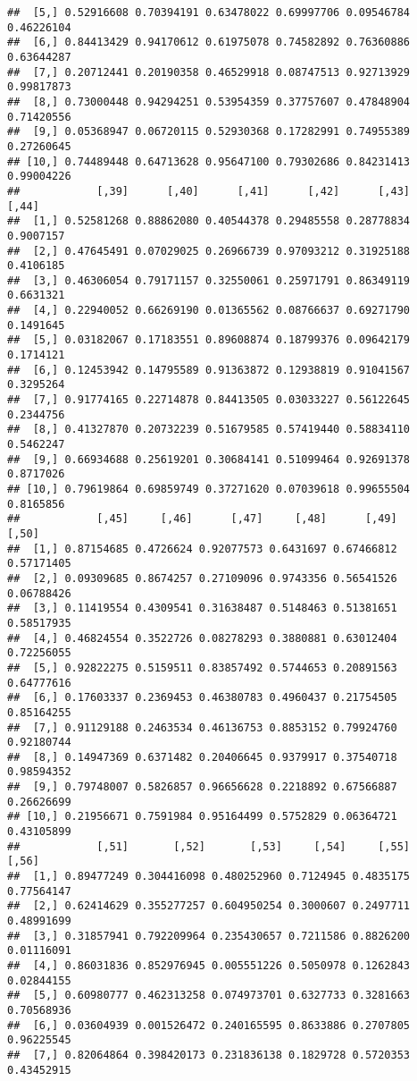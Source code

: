 \documentclass[
]{article}
\begin{document}
\begin{verbatim}
##  [5,] 0.52916608 0.70394191 0.63478022 0.69997706 0.09546784 0.46226104
##  [6,] 0.84413429 0.94170612 0.61975078 0.74582892 0.76360886 0.63644287
##  [7,] 0.20712441 0.20190358 0.46529918 0.08747513 0.92713929 0.99817873
##  [8,] 0.73000448 0.94294251 0.53954359 0.37757607 0.47848904 0.71420556
##  [9,] 0.05368947 0.06720115 0.52930368 0.17282991 0.74955389 0.27260645
## [10,] 0.74489448 0.64713628 0.95647100 0.79302686 0.84231413 0.99004226
##            [,39]      [,40]      [,41]      [,42]      [,43]     [,44]
##  [1,] 0.52581268 0.88862080 0.40544378 0.29485558 0.28778834 0.9007157
##  [2,] 0.47645491 0.07029025 0.26966739 0.97093212 0.31925188 0.4106185
##  [3,] 0.46306054 0.79171157 0.32550061 0.25971791 0.86349119 0.6631321
##  [4,] 0.22940052 0.66269190 0.01365562 0.08766637 0.69271790 0.1491645
##  [5,] 0.03182067 0.17183551 0.89608874 0.18799376 0.09642179 0.1714121
##  [6,] 0.12453942 0.14795589 0.91363872 0.12938819 0.91041567 0.3295264
##  [7,] 0.91774165 0.22714878 0.84413505 0.03033227 0.56122645 0.2344756
##  [8,] 0.41327870 0.20732239 0.51679585 0.57419440 0.58834110 0.5462247
##  [9,] 0.66934688 0.25619201 0.30684141 0.51099464 0.92691378 0.8717026
## [10,] 0.79619864 0.69859749 0.37271620 0.07039618 0.99655504 0.8165856
##            [,45]     [,46]      [,47]     [,48]      [,49]      [,50]
##  [1,] 0.87154685 0.4726624 0.92077573 0.6431697 0.67466812 0.57171405
##  [2,] 0.09309685 0.8674257 0.27109096 0.9743356 0.56541526 0.06788426
##  [3,] 0.11419554 0.4309541 0.31638487 0.5148463 0.51381651 0.58517935
##  [4,] 0.46824554 0.3522726 0.08278293 0.3880881 0.63012404 0.72256055
##  [5,] 0.92822275 0.5159511 0.83857492 0.5744653 0.20891563 0.64777616
##  [6,] 0.17603337 0.2369453 0.46380783 0.4960437 0.21754505 0.85164255
##  [7,] 0.91129188 0.2463534 0.46136753 0.8853152 0.79924760 0.92180744
##  [8,] 0.14947369 0.6371482 0.20406645 0.9379917 0.37540718 0.98594352
##  [9,] 0.79748007 0.5826857 0.96656628 0.2218892 0.67566887 0.26626699
## [10,] 0.21956671 0.7591984 0.95164499 0.5752829 0.06364721 0.43105899
##            [,51]       [,52]       [,53]     [,54]     [,55]      [,56]
##  [1,] 0.89477249 0.304416098 0.480252960 0.7124945 0.4835175 0.77564147
##  [2,] 0.62414629 0.355277257 0.604950254 0.3000607 0.2497711 0.48991699
##  [3,] 0.31857941 0.792209964 0.235430657 0.7211586 0.8826200 0.01116091
##  [4,] 0.86031836 0.852976945 0.005551226 0.5050978 0.1262843 0.02844155
##  [5,] 0.60980777 0.462313258 0.074973701 0.6327733 0.3281663 0.70568936
##  [6,] 0.03604939 0.001526472 0.240165595 0.8633886 0.2707805 0.96225545
##  [7,] 0.82064864 0.398420173 0.231836138 0.1829728 0.5720353 0.43452915

\end{verbatim}
\end{document}
